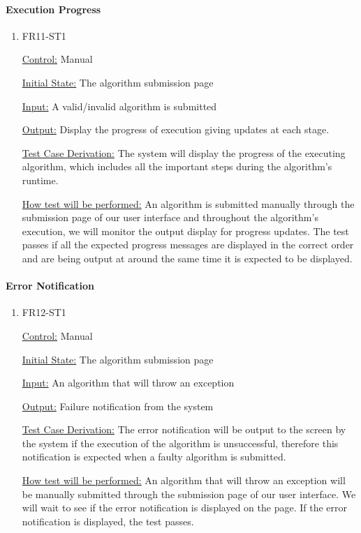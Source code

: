 \documentclass[12pt, titlepage]{article}
\begin{document}
\paragraph{Execution Progress}

\begin{enumerate}

\item{FR11-ST1\\}

\underline{Control:} Manual 

\underline{Initial State:} The algorithm submission page

\underline{Input:} A valid/invalid algorithm is submitted

\underline{Output:} Display the progress of execution giving updates at each stage.

\underline{Test Case Derivation:} The system will display the progress of the executing algorithm, which includes all the important steps during the algorithm’s runtime. 

\underline{How test will be performed:} An algorithm is submitted manually through the submission page of our user interface and throughout the algorithm’s execution, we will monitor the output display for progress updates. The test passes if all the expected progress messages are displayed in the correct order and are being output at around the same time it is expected to be displayed.

\end{enumerate}

\paragraph{Error Notification}

\begin{enumerate}

\item{FR12-ST1\\}

\underline{Control:} Manual 

\underline{Initial State:} The algorithm submission page

\underline{Input:} An algorithm that will throw an exception

\underline{Output:} Failure notification from the system

\underline{Test Case Derivation:} The error notification will be output to the screen by the system if the execution of the algorithm is unsuccessful, therefore this notification is expected when a faulty algorithm is submitted.

\underline{How test will be performed:} An algorithm that will throw an exception will be manually submitted through the submission page of our user interface. We will wait to see if the error notification is displayed on the page. If the error notification is displayed, the test passes.

\end{enumerate}
\end{document}
